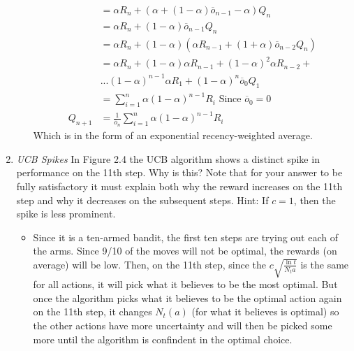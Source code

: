 \documentclass{article}
\begin{document}
\begin{enumerate}
\begin{itemize}
\begin{align}
            &= \alpha R_n + (\alpha + (1 - \alpha)\overline{o}_{n-1} - \alpha) Q_n \\
            &= \alpha R_n + (1 - \alpha)\overline{o}_{n-1} Q_n \\
            &= \alpha R_n+ (1 - \alpha)(\alpha R_{n-1} + (1 + \alpha)\overline{o}_{n-2} Q_n) \\
            &= \alpha R_n + (1 - \alpha)\alpha R_{n-1} + (1-\alpha)^2 \alpha R_{n-2} + \\ &... (1-\alpha)^{n-1}\alpha R_1 + (1-\alpha)^{n}\overline{o}_0 Q_1 \\
            &= \sum^{n}_{i=1} \alpha (1 - \alpha)^{n-1} R_i \text{ Since $\overline{o}_0 = 0$} \\
            Q_{n+1} &= \frac{1}{\overline{o}_n} \sum^{n}_{i=1} \alpha (1 - \alpha)^{n-1} R_i
        \end{align}
        Which is in the form of an exponential recency-weighted average.
    \end{itemize}

    \item \emph{UCB Spikes} In Figure 2.4 the UCB algorithm shows a distinct spike in performance on the 11th step. Why is this? Note that for your answer to be fully satisfactory it must explain both why the reward increases on the 11th step and why it decreases on the subsequent steps. Hint: If $c=1$, then the spike is less prominent.
    \begin{itemize}
        \item Since it is a ten-armed bandit, the first ten steps are trying out each of the arms. Since 9/10 of the moves will not be optimal, the rewards (on average) will be low. Then, on the 11th step, since the $c\sqrt{\frac{\ln{t}}{N_t{a}}}$ is the same for all actions, it will pick what it believes to be the most optimal. But once the algorithm picks what it believes to be the optimal action again on the 11th step, it changes $N_t(a)$ (for what it believes is optimal) so the other actions have more uncertainty and will then be picked some more until the algorithm is confindent in the optimal choice. 
    \end{itemize}


\end{enumerate}
\end{document}
